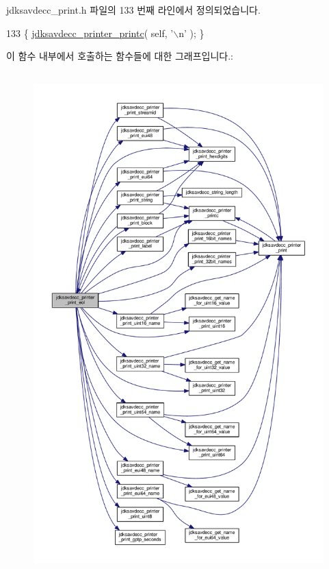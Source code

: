 jdksavdecc\+\_\+print.\+h 파일의 133 번째 라인에서 정의되었습니다.


\begin{DoxyCode}
133 \{ \hyperlink{group__util_ga24b25588730b43333c7b35cecc8f581d}{jdksavdecc\_printer\_printc}( \textcolor{keyword}{self}, \textcolor{charliteral}{'\(\backslash\)n'} ); \}
\end{DoxyCode}


이 함수 내부에서 호출하는 함수들에 대한 그래프입니다.\+:
\nopagebreak
\begin{figure}[H]
\begin{center}
\leavevmode
\includegraphics[height=550pt]{group__util_gacda56c9d3d24593a52c999682fa6e6e3_cgraph}
\end{center}
\end{figure}





